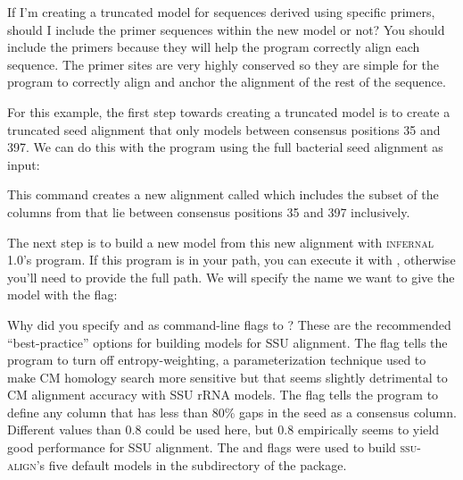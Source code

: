 \begin{srefaq}{If I'm creating a truncated model for sequences derived
    using specific primers, should I include the primer sequences
    within the new model or not?} You should include the primers
  because they will help the program correctly align each
  sequence. The primer sites are very highly conserved so they are
  simple for the program to correctly align and anchor the alignment
  of the rest of the sequence.
\end{srefaq}

For this example, the first step towards creating a truncated model is
to create a truncated seed alignment that only models between
consensus positions 35 and 397. We can do this with the
 program using the full bacterial seed alignment as
input:


This command creates a new alignment called  which
includes the subset of the columns from  that lie
between consensus positions 35 and 397 inclusively.

The next step is to build a new model from this new alignment with
\textsc{infernal} 1.0's  program. If this program is in
your path, you can execute it with , otherwise you'll
need to provide the full path. We will specify the name we want
to give the model with the  flag:


\begin{srefaq}{Why did you specify  and
     as command-line flags to ?}
    These are the recommended ``best-practice'' options for building
    models for SSU alignment. The  flag tells the
    program to turn off entropy-weighting, a parameterization
    technique used to make CM homology search more sensitive
    \cite{Nawrocki07} but that seems slightly detrimental to CM
    alignment accuracy with SSU rRNA models. The  flag tells the program to define any column that has less
    than 80\% gaps in the seed as a consensus column. Different values
    than 0.8 could be used here, but 0.8 empirically seems to yield
    good performance for SSU alignment. The  and
     flags were used to build
    \textsc{ssu-align}'s five default models in the 
    subdirectory of the package.
\end{srefaq}

